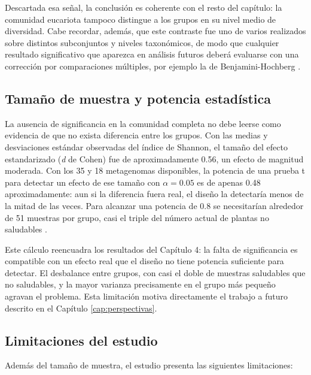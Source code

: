 Descartada esa señal, la conclusión es coherente con el resto del capítulo: la comunidad eucariota
tampoco distingue a los grupos en su nivel medio de diversidad. Cabe recordar, además, que este
contraste fue uno de varios realizados sobre distintos subconjuntos y niveles taxonómicos, de modo
que cualquier resultado significativo que aparezca en análisis futuros deberá evaluarse con una
corrección por comparaciones múltiples, por ejemplo la de Benjamini-Hochberg
\citep{benjamini1995controlling}.

\subsection{Tamaño de muestra y potencia estadística}

La ausencia de significancia en la comunidad completa no debe leerse como evidencia de que no exista
diferencia entre los grupos. Con las medias y desviaciones estándar observadas del índice de
Shannon, el tamaño del efecto estandarizado (\emph{d} de Cohen) fue de aproximadamente 0.56, un
efecto de magnitud moderada. Con los 35 y 18 metagenomas disponibles, la potencia de una prueba t
para detectar un efecto de ese tamaño con $\alpha = 0.05$ es de apenas 0.48 aproximadamente: aun si
la diferencia fuera real, el diseño la detectaría menos de la mitad de las veces. Para alcanzar una
potencia de 0.8 se necesitarían alrededor de 51 muestras por grupo, casi el triple del número
actual de plantas no saludables \citep{xia2018statistical}.

Este cálculo reencuadra los resultados del Capítulo 4: la falta de significancia es compatible con
un efecto real que el diseño no tiene potencia suficiente para detectar. El desbalance entre grupos,
con casi el doble de muestras saludables que no saludables, y la mayor varianza precisamente en el
grupo más pequeño agravan el problema. Esta limitación motiva directamente el trabajo a futuro
descrito en el Capítulo \ref{cap:perspectivas}.

\subsection{Limitaciones del estudio}

Además del tamaño de muestra, el estudio presenta las siguientes limitaciones:

